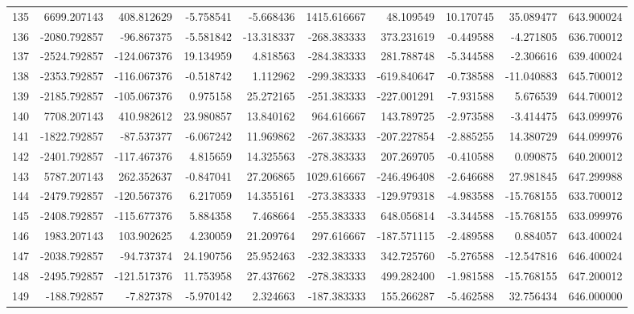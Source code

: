 \begin{tabular}{lrrrrrrrrr}
135 &   6699.207143 &   408.812629 &  -5.758541 &  -5.668436 &  1415.616667 &    48.109549 &  10.170745 &  35.089477 &  643.900024 \\
136 &  -2080.792857 &   -96.867375 &  -5.581842 & -13.318337 &  -268.383333 &   373.231619 &  -0.449588 &  -4.271805 &  636.700012 \\
137 &  -2524.792857 &  -124.067376 &  19.134959 &   4.818563 &  -284.383333 &   281.788748 &  -5.344588 &  -2.306616 &  639.400024 \\
138 &  -2353.792857 &  -116.067376 &  -0.518742 &   1.112962 &  -299.383333 &  -619.840647 &  -0.738588 & -11.040883 &  645.700012 \\
139 &  -2185.792857 &  -105.067376 &   0.975158 &  25.272165 &  -251.383333 &  -227.001291 &  -7.931588 &   5.676539 &  644.700012 \\
140 &   7708.207143 &   410.982612 &  23.980857 &  13.840162 &   964.616667 &   143.789725 &  -2.973588 &  -3.414475 &  643.099976 \\
141 &  -1822.792857 &   -87.537377 &  -6.067242 &  11.969862 &  -267.383333 &  -207.227854 &  -2.885255 &  14.380729 &  644.099976 \\
142 &  -2401.792857 &  -117.467376 &   4.815659 &  14.325563 &  -278.383333 &   207.269705 &  -0.410588 &   0.090875 &  640.200012 \\
143 &   5787.207143 &   262.352637 &  -0.847041 &  27.206865 &  1029.616667 &  -246.496408 &  -2.646688 &  27.981845 &  647.299988 \\
144 &  -2479.792857 &  -120.567376 &   6.217059 &  14.355161 &  -273.383333 &  -129.979318 &  -4.983588 & -15.768155 &  633.700012 \\
145 &  -2408.792857 &  -115.677376 &   5.884358 &   7.468664 &  -255.383333 &   648.056814 &  -3.344588 & -15.768155 &  633.099976 \\
146 &   1983.207143 &   103.902625 &   4.230059 &  21.209764 &   297.616667 &  -187.571115 &  -2.489588 &   0.884057 &  643.400024 \\
147 &  -2038.792857 &   -94.737374 &  24.190756 &  25.952463 &  -232.383333 &   342.725760 &  -5.276588 & -12.547816 &  646.400024 \\
148 &  -2495.792857 &  -121.517376 &  11.753958 &  27.437662 &  -278.383333 &   499.282400 &  -1.981588 & -15.768155 &  647.200012 \\
149 &   -188.792857 &    -7.827378 &  -5.970142 &   2.324663 &  -187.383333 &   155.266287 &  -5.462588 &  32.756434 &  646.000000 \\

\end{tabular}
